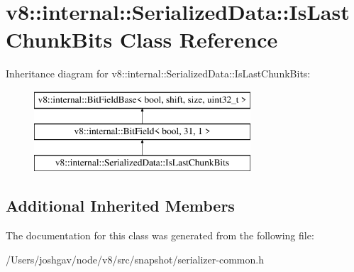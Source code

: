 \hypertarget{classv8_1_1internal_1_1_serialized_data_1_1_is_last_chunk_bits}{}\section{v8\+:\+:internal\+:\+:Serialized\+Data\+:\+:Is\+Last\+Chunk\+Bits Class Reference}
\label{classv8_1_1internal_1_1_serialized_data_1_1_is_last_chunk_bits}
Inheritance diagram for v8\+:\+:internal\+:\+:Serialized\+Data\+:\+:Is\+Last\+Chunk\+Bits\+:\begin{figure}[H]
\begin{center}
\leavevmode
\includegraphics[height=3.000000cm]{classv8_1_1internal_1_1_serialized_data_1_1_is_last_chunk_bits}
\end{center}
\end{figure}
\subsection*{Additional Inherited Members}


The documentation for this class was generated from the following file\+:\begin{DoxyCompactItemize}
\item 
/\+Users/joshgav/node/v8/src/snapshot/serializer-\/common.\+h\end{DoxyCompactItemize}
